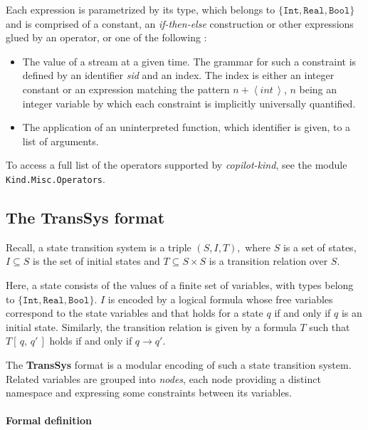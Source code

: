 \medskip

Each expression is parametrized by its type, which belongs to $\{
\texttt{Int}, \texttt{Real},  \texttt{Bool}\}$ and is comprised of a
constant, an \textit{if-then-else} construction or other expressions
glued by an operator, or one of the following :

\begin{itemize}
\item The value of a stream at a given time. The grammar for such
a constraint is defined by  an identifier \textit{sid} and an index. The index is either an integer constant or an expression matching the pattern $ \textit{n} +  \left< \textit{int} \,  \right> $, $n$ being an integer variable by which each constraint is implicitly universally quantified.

\item The application of an uninterpreted function, which identifier is given, to a list of arguments.
\end{itemize}
To access a full list of the operators supported by \textit{copilot-kind}, see the module \texttt{Kind.Misc.Operators}.

\subsection{The \textbf{TransSys} format}

Recall, a state transition system is a triple $(S,I,T),$
where $S$ is a set of states, $I \subseteq S$ is the set of initial
states and $T \subseteq S \times S $ is a transition relation over $S$.


Here, a state consists of  the values of a finite set of variables, with types belong to $\{ \texttt{Int}, \texttt{Real},  \texttt{Bool}\}$. $I$ is encoded by a logical formula whose free variables correspond to the state variables and that holds for a state $q$ if and only if $q$ is an initial state. Similarly, the transition relation is given by a formula $T$ such that $T\left[\, q, \, q' \,\right]$ holds if and only if $q \rightarrow q'$. 


The \textbf{TransSys} format is a modular encoding of such a state transition system. Related variables are grouped into \textit{nodes}, each node providing a distinct namespace and expressing some constraints between its variables. 



\paragraph{Formal definition}

